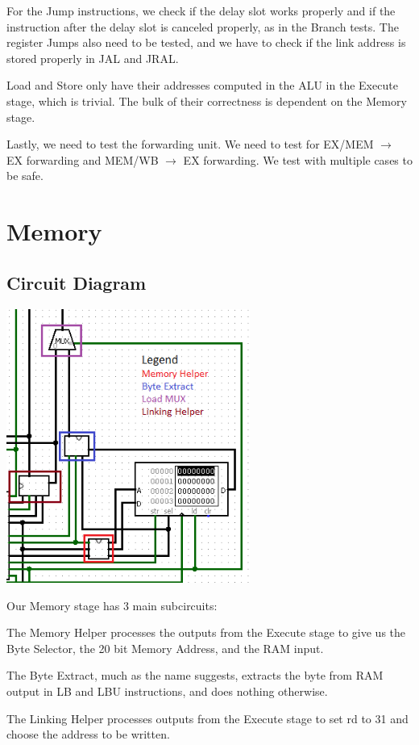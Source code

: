 \documentclass{article}
\begin{document}
For the Jump instructions, we check if the delay slot works properly and if the instruction after the delay slot is canceled properly, as in the Branch tests. The register Jumps also need to be tested, and we have to check if the link address is stored properly in JAL and JRAL. 

Load and Store only have their addresses computed in the ALU in the Execute stage, which is trivial. The bulk of their correctness is dependent on the Memory stage.

Lastly, we need to test the forwarding unit. We need to test for EX/MEM $\rightarrow$ EX forwarding and MEM/WB $\rightarrow$ EX forwarding. We test with multiple cases to be safe. 

\section{Memory}
\subsection{Circuit Diagram}
\includegraphics[width=8cm]{MemOver.png}

Our Memory stage has 3 main subcircuits:

 The Memory Helper processes the outputs from the Execute stage to give us the Byte Selector, the 20 bit Memory Address, and the RAM input. 
 
 The Byte Extract, much as the name suggests, extracts the byte from RAM output in LB and LBU instructions, and does nothing otherwise.
 
 The Linking Helper processes outputs from the Execute stage to set rd to 31 and choose the address to be written. 
 
\end{document}
